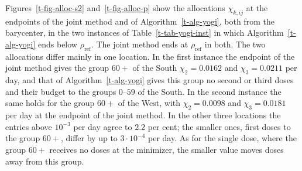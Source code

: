 \documentclass[11pt]{article}
\theoremstyle{plain}
\theoremstyle{remark}
\numberwithin{equation}{section}
\begin{document}
Figures~\ref{t-fig-alloc-s2} and~\ref{t-fig-alloc-p} show the allocations
$\chi_{k,ij}$ at the endpoints of the joint method and of
Algorithm~\ref{t-alg-yogi}, both from the barycenter, in the two instances of
Table~\ref{t-tab-yogi-inst} in which Algorithm~\ref{t-alg-yogi} ends below
$\rho_{\mathrm{ref}}$. The joint method ends at $\rho_{\mathrm{ref}}$ in both.
The two allocations differ mainly in one location. In the first instance the
endpoint of the joint method gives the group $60+$ of the South
$\chi_{2}=0.0162$ and $\chi_{3}=0.0211$ per day, and that of
Algorithm~\ref{t-alg-yogi} gives this group no second or third doses and their
budget to the groups $0$--$59$ of the South. In the second instance the same
holds for the group $60+$ of the West, with $\chi_{2}=0.0098$ and
$\chi_{3}=0.0181$ per day at the endpoint of the joint method. In the other
three locations the entries above $10^{-3}$ per day agree to $2.2$ per cent;
the smaller ones, first doses to the group $60+$, differ by up to
$3\cdot 10^{-4}$ per day. As for the single dose,
where the group $60+$ receives no doses at the minimizer, the smaller value
moves doses away from this group.
\end{document}
